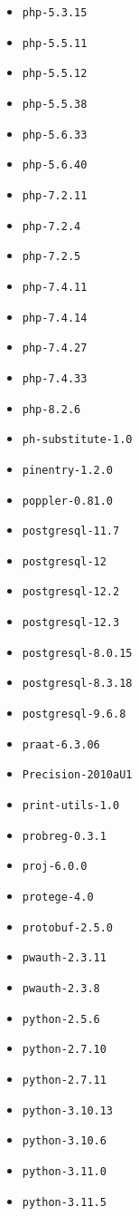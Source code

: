 \begin{multicols}{3}
\begin{itemize}
\item \verb|php-5.3.15|
\item \verb|php-5.5.11|
\item \verb|php-5.5.12|
\item \verb|php-5.5.38|
\item \verb|php-5.6.33|
\item \verb|php-5.6.40|
\item \verb|php-7.2.11|
\item \verb|php-7.2.4|
\item \verb|php-7.2.5|
\item \verb|php-7.4.11|
\item \verb|php-7.4.14|
\item \verb|php-7.4.27|
\item \verb|php-7.4.33|
\item \verb|php-8.2.6|
\item \verb|ph-substitute-1.0|
\item \verb|pinentry-1.2.0|
\item \verb|poppler-0.81.0|
\item \verb|postgresql-11.7|
\item \verb|postgresql-12|
\item \verb|postgresql-12.2|
\item \verb|postgresql-12.3|
\item \verb|postgresql-8.0.15|
\item \verb|postgresql-8.3.18|
\item \verb|postgresql-9.6.8|
\item \verb|praat-6.3.06|
\item \verb|Precision-2010aU1|
\item \verb|print-utils-1.0|
\item \verb|probreg-0.3.1|
\item \verb|proj-6.0.0|
\item \verb|protege-4.0|
\item \verb|protobuf-2.5.0|
\item \verb|pwauth-2.3.11|
\item \verb|pwauth-2.3.8|
\item \verb|python-2.5.6|
\item \verb|python-2.7.10|
\item \verb|python-2.7.11|
\item \verb|python-3.10.13|
\item \verb|python-3.10.6|
\item \verb|python-3.11.0|
\item \verb|python-3.11.5|

\end{itemize}
\end{multicols}
